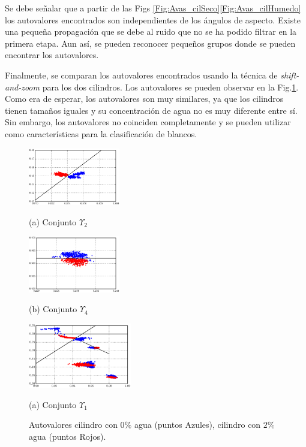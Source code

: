 	
	Se debe señalar que  a partir de las Figs \ref{Fig:Avas_cilSeco}\ref{Fig:Avas_cilHumedo} los autovalores  encontrados son independientes de los ángulos de aspecto. Existe una pequeña propagación que se debe al ruido que no se ha podido filtrar en la primera etapa. Aun así, se pueden reconocer pequeños grupos donde se pueden encontrar los autovalores.
	
	Finalmente, se comparan los autovalores encontrados usando la técnica de \emph{shift-and-zoom}  para los dos cilindros. Los autovalores se pueden observar en la Fig.\ref{Fig:Avas_cilSecoHumedo}. Como era de esperar, los autovalores son muy similares, ya que los cilindros tienen tamaños iguales y su concentración de agua no es muy diferente entre sí. Sin embargo, los autovalores no coinciden completamente y se pueden utilizar como características para la clasificación de blancos.
	
	\begin{figure}[ht]
		\begin{minipage}[b]{.48\linewidth}
			\centering
			\centerline{\includegraphics[width=4.0cm]{Figuras/set2}}
			\centerline{(a) Conjunto $\varUpsilon_2$}\medskip
		\end{minipage}
		\hfill
		\begin{minipage}[b]{0.48\linewidth}
			\centering
			\centerline{\includegraphics[width=4.0cm]{Figuras/set5}}
			\centerline{(b) Conjunto $\varUpsilon_4$}\medskip
		\end{minipage}
		\begin{minipage}[b]{1.0\linewidth}
			\centering
			\centerline{\includegraphics[width=4.5cm]{Figuras/set1}}
			\centerline{(a) Conjunto $\varUpsilon_1$}\medskip
		\end{minipage}
		\caption{Autovalores cilindro con $0\%$ agua (puntos Azules), cilindro con $2\%$ agua (puntos Rojos).}
		\label{Fig:Avas_cilSecoHumedo}
	\end{figure}
	
